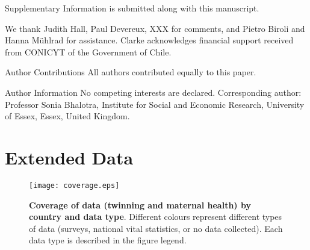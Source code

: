 \documentclass{nature}
\begin{document}
\begin{linenumbers}


\clearpage



\clearpage
\begin{addendum}
 \item[Supplementary Information] is submitted along with this manuscript.
 \item We thank Judith Hall, Paul Devereux, XXX for comments, and Pietro Biroli and Hanna M\"uhlrad for assistance.  Clarke acknowledges financial support received from CONICYT of the Government of Chile.
 \item[Author Contributions] All authors contributed equally to this paper.
 \item[Author Information] No competing interests are declared.  Corresponding author: Professor Sonia Bhalotra, Institute for Social and Economic Research, University of Essex, Essex, United Kingdom.
\end{addendum}

\clearpage
\section{Extended Data}
\setcounter{figure}{0}
\setcounter{table}{0}
\renewcommand{\tablename}{Extended Data Table}
\renewcommand{\figurename}{Extended Data Figure}

\begin{spacing}{1}
\begin{figure}[htpb!]
\texttt{[image: coverage.eps]}
\caption{\textbf{Coverage of data (twinning and maternal health) by country and data type}. {\footnotesize  Different colours represent different types of data (surveys, national vital statistics, or no data collected).  Each data type is described in the figure legend.}}
\label{fig:twincoverage}
\end{figure}



\end{spacing}
\end{linenumbers}
\end{document}
